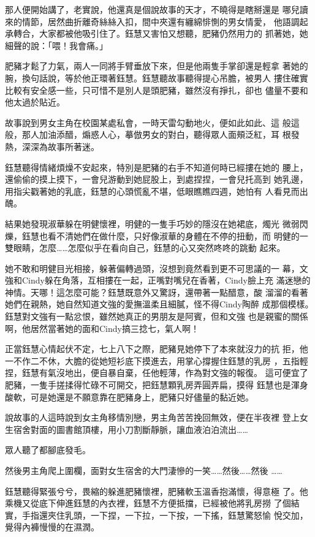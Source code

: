 那人便開始講了，老實說，他還真是個說故事的天才，不曉得是瞎掰還是
哪兒讀來的情節，居然曲折離奇絲絲入扣，間中夾還有纏綿悱惻的男女情愛，
他語調起承轉合，大家都被他吸引住了。鈺慧又害怕又想聽，肥豬仍然用力的
抓著她，她細聲的說：「喂！我會痛。」

肥豬才鬆了力氣，兩人一同將手臂垂放下來，但是他兩隻手掌卻還是輕拿
著她的腕，換句話說，等於他正環著鈺慧。鈺慧聽故事聽得提心吊膽，被男人
摟住確實比較有安全感一些，只可惜不是別人是頭肥豬，雖然沒有掙扎，卻也
儘量不要和他太過於貼近。

故事說到男女主角在校園某處私會，一時天雷勾動地火，便如此如此、這
般這般，那人加油添醋，煽惑人心，摹倣男女的對白，聽得眾人面頰泛紅，耳
根發熱，深深為故事所著迷。

鈺慧聽得情緒煩燥不安起來，特別是肥豬的右手不知道何時已經摟在她的
腰上，還偷偷的摸上摸下，一會兒游動到她屁股上，到處捏捏，一會兒托高到
她乳邊，用指尖戳著她的乳底，鈺慧的心頭慌亂不堪，低眼瞧瞧四週，她怕有
人看見而出醜。

結果她發現淑華躲在明健懷裡，明健的一隻手巧妙的隱沒在她裙底，燭光
微弱閃爍，鈺慧也看不清她們在做什麼，只好像淑華的身體在不停的扭動，而
明健的一雙眼睛，怎麼……怎麼似乎在看向自己，鈺慧的心又突然咚咚的跳動
起來。

她不敢和明健目光相接，躲著偏轉過頭，沒想到竟然看到更不可思議的一
幕，文強和Cindy躲在角落，互相摟在一起，正嘴對嘴兒在香著，Cindy臉上充
滿迷戀的神情。天哪！這怎麼可能？鈺慧既意外又驚訝，還帶著一點醋意，酸
溜溜的看著她們在親熱，她自然知道文強的愛撫溫柔且細膩，怪不得Cindy陶醉
成那個模樣。鈺慧對文強有一點忿恨，雖然她真正的男朋友是阿賓，但和文強
也是親蜜的關係啊，他居然當著她的面和Cindy搞三捻七，氣人啊！

正當鈺慧心情起伏不定，七上八下之際，肥豬見她停下了本來就沒力的抗
拒，他一不作二不休，大膽的從她短衫底下摸進去，用掌心撐握住鈺慧的乳房
，五指輕捏，鈺慧有氣沒地出，便自暴自棄，任他輕薄，作為對文強的報復。
這可便宜了肥豬，一隻手搓揉得忙碌不可開交，把鈺慧顆乳房弄圓弄扁，摸得
鈺慧也是渾身酸軟，可是她還是不願意靠在肥豬身上，肥豬只好儘量的黏近她。

說故事的人這時說到女主角移情別戀，男主角苦苦挽回無效，便在半夜裡
登上女生宿舍對面的圖書館頂樓，用小刀割斷靜脈，讓血液泊泊流出……

眾人聽了都腳底發毛。

然後男主角爬上圍欄，面對女生宿舍的大門淒慘的一笑……然後……然後
……

鈺慧聽得緊張兮兮，畏縮的躲進肥豬懷裡，肥豬軟玉溫香抱滿懷，得意極
了。他乘機又從底下伸進鈺慧的內衣裡，鈺慧不方便抵擋，已經被他將乳房撈
了個結實，手指還夾住乳頭，一下捏，一下拉，一下按，一下搖，鈺慧驚怒愉
悅交加，覺得內褲慢慢的在濕潤。

